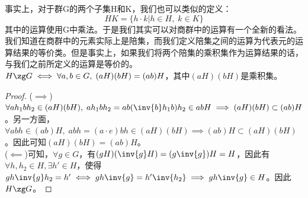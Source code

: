 \indent 事实上，对于群G的两个子集H和K，我们也可以类似的定义：
\[
HK=\{h\cdot k|h\in H,\; k\in K\}
\]
其中的运算使用G中乘法。于是我们其实可以对商群中的运算有一个全新的看法。\\
我们知道在商群中的元素实际上是陪集，而我们定义陪集之间的运算为代表元的运算结果的等价类。但是事实上，如果我们将两个陪集的乘积集作为运算结果的话，与我们之前所定义的运算是等价的。\\
$H\zg G\iff \forall a,b\in G,\; (aH)(bH)=(ab)H$，其中$(aH)(bH)$是乘积集。
\begin{proof}
($\implies$)$\forall ah_1bh_2\in (aH)(bH),\; ah_1bh_2=ab(\inv{b}h_1b)h_2\in abH\implies (aH)(bH)\subset(ab)H$。另一方面，$\forall abh\in (ab)H,\; abh=(a\cdot e)bh\in (aH)(bH)\implies (ab)H\subset(aH)(bH)$。因此可知$(aH)(bH)=(ab)H$。\\
($\impliedby$)可知，$\forall g\in G$，有$(gH)(\inv{g}H)=(g\inv{g})H=H$，因此有$\forall h,h_2\in H,\exists h'\in H$，使得$gh\inv{g}h_2=h'\iff gh\inv{g}=h'\inv{h_2}\implies gh\inv{g}\in H$。因此$H\zg G$。
\end{proof}

